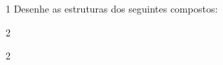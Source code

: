 \documentclass[\mainfilename]{subfiles}
\begin{document}
\begin{questionBox}1{ %
    Desenhe as estruturas dos seguintes compostos:
} %
    \begin{multicols}{2}
        \begin{questionBox}2{ %
        } %
            \begin{center}
            \end{center}
        \end{questionBox}

        \begin{questionBox}2{ %
        } %
            \begin{center}
            \end{center}
        \end{questionBox}
    \end{multicols}
\end{questionBox}
\end{document}
